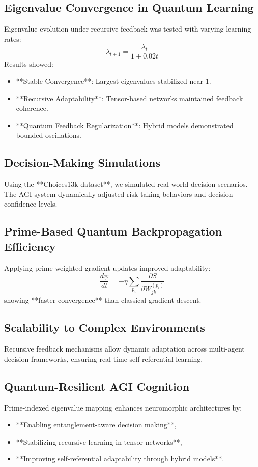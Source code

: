 \documentclass{article}
\theoremstyle{plain}
\theoremstyle{plain}
\theoremstyle{definition}
\theoremstyle{remark}
\begin{document}
\subsection{Eigenvalue Convergence in Quantum Learning}
Eigenvalue evolution under recursive feedback was tested with varying learning rates:
\begin{equation}
\lambda_{t+1} = \frac{\lambda_t}{1 + 0.02t}
\end{equation}
Results showed:
\begin{itemize}
    \item **Stable Convergence**: Largest eigenvalues stabilized near 1.
    \item **Recursive Adaptability**: Tensor-based networks maintained feedback coherence.
    \item **Quantum Feedback Regularization**: Hybrid models demonstrated bounded oscillations.
\end{itemize}

\subsection{Decision-Making Simulations}
Using the **Choices13k dataset**, we simulated real-world decision scenarios. The AGI system dynamically adjusted risk-taking behaviors and decision confidence levels.

\subsection{Prime-Based Quantum Backpropagation Efficiency}
Applying prime-weighted gradient updates improved adaptability:
\begin{equation}
\frac{d \psi}{dt} = -\eta \sum_{p_i} \frac{\partial S}{\partial W_{jk}^{(p_i)}}
\end{equation}
showing **faster convergence** than classical gradient descent.

\subsection{Scalability to Complex Environments}
Recursive feedback mechanisms allow dynamic adaptation across multi-agent decision frameworks, ensuring real-time self-referential learning.

\subsection{Quantum-Resilient AGI Cognition}
Prime-indexed eigenvalue mapping enhances neuromorphic architectures by:
\begin{itemize}
    \item **Enabling entanglement-aware decision making**,
    \item **Stabilizing recursive learning in tensor networks**,
    \item **Improving self-referential adaptability through hybrid models**.
\end{itemize}
\end{document}
